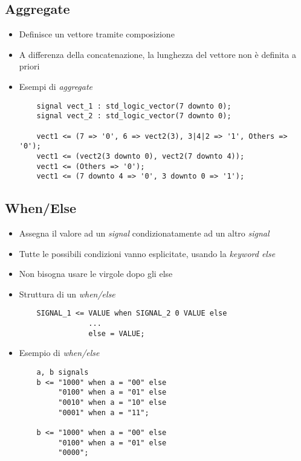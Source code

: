 \documentclass{article}
\begin{document}
\newpage

\subsection{Aggregate}
\begin{itemize}
	\item Definisce un vettore tramite composizione
	\item A differenza della concatenazione, la lunghezza del vettore non è definita a priori
	\item Esempi di \textit{aggregate}
	      \begin{verbatim}
    signal vect_1 : std_logic_vector(7 downto 0);
    signal vect_2 : std_logic_vector(7 downto 0);
        
    vect1 <= (7 => '0', 6 => vect2(3), 3|4|2 => '1', Others => '0');
    vect1 <= (vect2(3 downto 0), vect2(7 downto 4));
    vect1 <= (Others => '0');
    vect1 <= (7 downto 4 => '0', 3 downto 0 => '1');
	      \end{verbatim}
\end{itemize}

\subsection{When/Else}
\begin{itemize}
	\item Assegna il valore ad un \textit{signal} condizionatamente ad un altro \textit{signal}
	\item Tutte le possibili condizioni vanno esplicitate, usando la \textit{keyword else}
	\item Non bisogna usare le virgole dopo gli else
	\item Struttura di un \textit{when/else}
	      \begin{verbatim}
    SIGNAL_1 <= VALUE when SIGNAL_2 0 VALUE else
                ...
                else = VALUE;
	      \end{verbatim}
	\item Esempio di \textit{when/else}
	      \begin{verbatim}
    a, b signals
    b <= "1000" when a = "00" else
         "0100" when a = "01" else
         "0010" when a = "10" else
         "0001" when a = "11";
             
    b <= "1000" when a = "00" else
         "0100" when a = "01" else
         "0000";
	      \end{verbatim}
\end{itemize}
\end{document}
